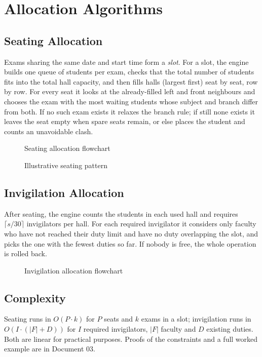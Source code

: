 \documentclass[12pt,a4paper,oneside]{report}
\begin{document}
\chapter{Allocation Algorithms}
\section{Seating Allocation}
Exams sharing the same date and start time form a \emph{slot}. For a slot, the engine builds one queue of students per exam, checks that the total number of students fits into the total hall capacity, and then fills halls (largest first) seat by seat, row by row. For every seat it looks at the already-filled left and front neighbours and chooses the exam with the most waiting students whose subject and branch differ from both. If no such exam exists it relaxes the branch rule; if still none exists it leaves the seat empty when spare seats remain, or else places the student and counts an unavoidable clash.
\begin{figure}[H]\centering
\resizebox{!}{0.6\textheight}{}
\caption{Seating allocation flowchart}
\end{figure}
\begin{figure}[H]\centering

\caption{Illustrative seating pattern}
\end{figure}
\section{Invigilation Allocation}
After seating, the engine counts the students in each used hall and requires $\lceil s/30\rceil$ invigilators per hall. For each required invigilator it considers only faculty who have not reached their duty limit and have no duty overlapping the slot, and picks the one with the fewest duties so far. If nobody is free, the whole operation is rolled back.
\begin{figure}[H]\centering
\resizebox{!}{0.5\textheight}{}
\caption{Invigilation allocation flowchart}
\end{figure}
\section{Complexity}
Seating runs in $O(P \cdot k)$ for $P$ seats and $k$ exams in a slot; invigilation runs in $O(I \cdot (|F| + D))$ for $I$ required invigilators, $|F|$ faculty and $D$ existing duties. Both are linear for practical purposes. Proofs of the constraints and a full worked example are in Document 03.
\end{document}
